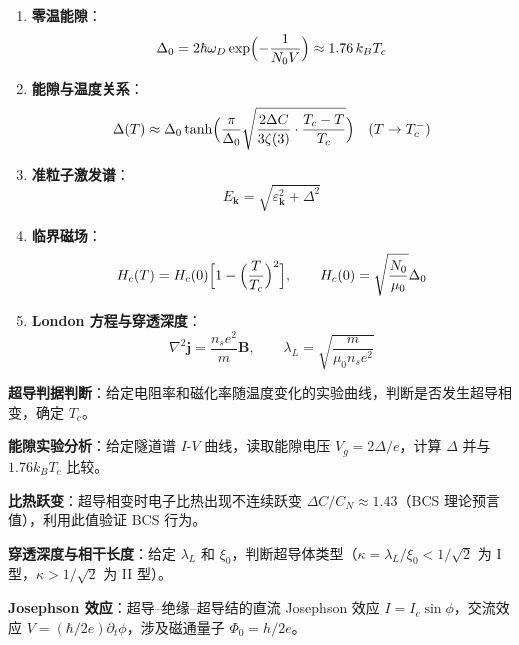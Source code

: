 \begin{formulabox}[核心公式]
\begin{enumerate}[label=\textbf{(\arabic*)}]
    \item \textbf{零温能隙}：
    \[
    \Delta_0=2\hbar\omega_D\exp\Bigl(-\frac{1}{N_0V}\Bigr)\approx1.76\,k_BT_c
    \]

    \item \textbf{能隙与温度关系}：
    \[
    \Delta(T)\approx\Delta_0\tanh\Bigl(\frac{\pi}{\Delta_0}\sqrt{\frac{2\Delta C}{3\zeta(3)}\cdot\frac{T_c-T}{T_c}}\Bigr)\quad(T\to T_c^-)
    \]

    \item \textbf{准粒子激发谱}：
    \[
    E_{\mathbf{k}}=\sqrt{\varepsilon_{\mathbf{k}}^2+\Delta^2}
    \]

    \item \textbf{临界磁场}：
    \[
    H_c(T)=H_c(0)\Bigl[1-\Bigl(\frac{T}{T_c}\Bigr)^2\Bigr],\qquad
    H_c(0)=\sqrt{\frac{N_0}{\mu_0}}\Delta_0
    \]

    \item \textbf{London 方程与穿透深度}：
    \[
    \nabla^2\mathbf{j}=\frac{n_se^2}{m}\mathbf{B},\qquad
    \lambda_L=\sqrt{\frac{m}{\mu_0n_se^2}}
    \]
\end{enumerate}
\end{formulabox}

\begin{drillbox}[训练点与考法变体]
 \textbf{超导判据判断}：给定电阻率和磁化率随温度变化的实验曲线，判断是否发生超导相变，确定 $T_c$。

 \textbf{能隙实验分析}：给定隧道谱 $I$-$V$ 曲线，读取能隙电压 $V_g=2\Delta/e$，计算 $\Delta$ 并与 $1.76k_BT_c$ 比较。

 \textbf{比热跃变}：超导相变时电子比热出现不连续跃变 $\Delta C/C_N\approx1.43$（BCS 理论预言值），利用此值验证 BCS 行为。

 \textbf{穿透深度与相干长度}：给定 $\lambda_L$ 和 $\xi_0$，判断超导体类型（$\kappa=\lambda_L/\xi_0<1/\sqrt{2}$ 为 I 型，$\kappa>1/\sqrt{2}$ 为 II 型）。

 \textbf{Josephson 效应}：超导--绝缘--超导结的直流 Josephson 效应 $I=I_c\sin\phi$，交流效应 $V=(\hbar/2e)\partial_t\phi$，涉及磁通量子 $\Phi_0=h/2e$。
\end{drillbox}

